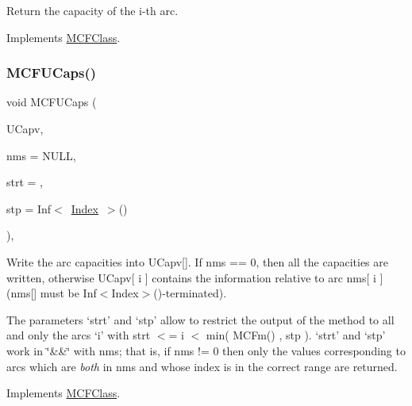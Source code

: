 Return the capacity of the i-\/th arc. 

Implements \mbox{\hyperlink{class_m_c_f_class_a3af18f0859dd6ddea9d29ed39c9b27a3}{M\+C\+F\+Class}}.

\mbox{\label{class_m_c_f_simplex_aa5d64c820aa5952a8cd80d4a89eb334a}} 
\subsubsection{\texorpdfstring{M\+C\+F\+U\+Caps()}{MCFUCaps()}}
{\footnotesize\ttfamily void M\+C\+F\+U\+Caps (\begin{DoxyParamCaption}\item[{\mbox{\hyperlink{class_m_c_f_class_a9dae1f1a39c208ce3c2b337cd5bb3d00}{F\+Row}}}]{U\+Capv,  }\item[{\mbox{\hyperlink{class_m_c_f_class_a81575b2d4e4d5636b17170432150ae69}{c\+Index\+\_\+\+Set}}}]{nms = {\ttfamily NULL},  }\item[{\mbox{\hyperlink{class_m_c_f_class_a76aaabb20535c51a2752b93f6c38fe54}{c\+Index}}}]{strt = {},  }\item[{\mbox{\hyperlink{class_m_c_f_class_ad53d6229d7ec28555a9c9c2fd9abf773}{Index}}}]{stp = {\ttfamily Inf$<$~\mbox{\hyperlink{class_m_c_f_class_ad53d6229d7ec28555a9c9c2fd9abf773}{Index}}~$>$()} }\end{DoxyParamCaption})\hspace{0.3cm}{\ttfamily [override]}, {\ttfamily [virtual]}}

Write the arc capacities into U\+Capv\mbox{[}\mbox{]}. If nms == 0, then all the capacities are written, otherwise U\+Capv\mbox{[} i \mbox{]} contains the information relative to arc nms\mbox{[} i \mbox{]} (nms\mbox{[}\mbox{]} must be Inf$<$\+Index$>$()-\/terminated).

The parameters `strt' and `stp' allow to restrict the output of the method to all and only the arcs `i' with strt $<$= i $<$ min( M\+C\+Fm() , stp ). `strt' and `stp' work in \char`\"{}\&\&\char`\"{} with nms; that is, if nms != 0 then only the values corresponding to arcs which are {\itshape both} in nms and whose index is in the correct range are returned. 

Implements \mbox{\hyperlink{class_m_c_f_class_a999b9738aa5cb925c5b4a799ed6d4838}{M\+C\+F\+Class}}.

